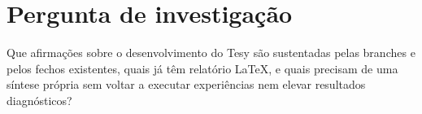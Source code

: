 \clearpage
\section{Pergunta de investigação}
Que afirmações sobre o desenvolvimento do Tesy são sustentadas pelas branches e pelos fechos existentes, quais já têm relatório LaTeX, e quais precisam de uma síntese própria sem voltar a executar experiências nem elevar resultados diagnósticos?

